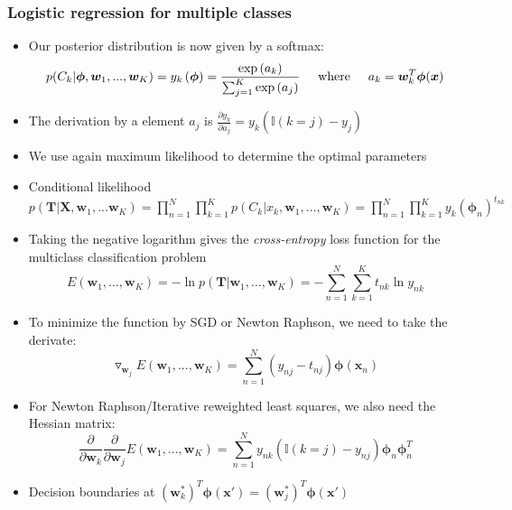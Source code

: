 \subsubsection{Logistic regression for multiple classes}
\begin{itemize}
	\item Our posterior distribution is now given by a softmax:
	$$p(C_k|\bm{\phi}, \bm{w}_1, ..., \bm{w}_K) = y_k\left(\bm{\phi}\right) = \frac{\exp\left(a_k\right)}{\sum_{j=1}^{K}\exp\left(a_j\right)} \text{\hspace{5mm}where\hspace{5mm}} a_k=\bm{w}_k^T\bm{\phi}(\bm{x})$$
	\item The derivation by a element $a_j$ is $\frac{\partial y_k}{\partial a_j}=y_k\left(\mathbb{I}\left(k=j\right) - y_j\right)$
	\item We use again maximum likelihood to determine the optimal parameters
	\item Conditional likelihood $p\left(\bm{T}|\bm{X},\bm{w}_1,...\bm{w}_K\right) = \prod\limits_{n=1}^{N}\prod\limits_{k=1}^{K}p(C_k|x_k, \bm{w}_1, ..., \bm{w}_K) = \prod\limits_{n=1}^{N}\prod\limits_{k=1}^{K} y_{k}\left(\bm{\phi}_n\right)^{t_{nk}}$
	\item Taking the negative logarithm gives the \textit{cross-entropy} loss function for the multiclass classification problem
	$$E\left(\bm{w}_1,...,\bm{w}_K\right) = - \ln p\left(\bm{T}|\bm{w}_1,...,\bm{w}_K\right) = -\sum\limits_{n=1}^{N}\sum\limits_{k=1}^{K} t_{nk} \ln y_{nk}$$
	\item To minimize the function by SGD or Newton Raphson, we need to take the derivate:
	$$\triangledown_{\bm{w}_j} E\left(\bm{w}_1, ...,\bm{w}_K\right) = \sum\limits_{n=1}^{N}\left(y_{nj} - t_{nj}\right) \bm{\phi}\left(\bm{x}_n\right)$$
	\item For Newton Raphson/Iterative reweighted least squares, we also need the Hessian matrix:
	$$\frac{\partial}{\partial \bm{w}_k}\frac{\partial}{\partial \bm{w}_j}E\left(\bm{w}_1,...,\bm{w}_K\right) = \sum\limits_{n=1}^{N} y_{nk}\left(\mathbb{I}\left(k=j\right) - y_{nj}\right) \bm{\phi}_n \bm{\phi}_n^T$$
	\item Decision boundaries at $\left(\bm{w}_k^*\right)^T \bm{\phi}\left(\bm{x}'\right) = \left(\bm{w}_j^*\right)^T \bm{\phi}\left(\bm{x}'\right)$
\end{itemize}